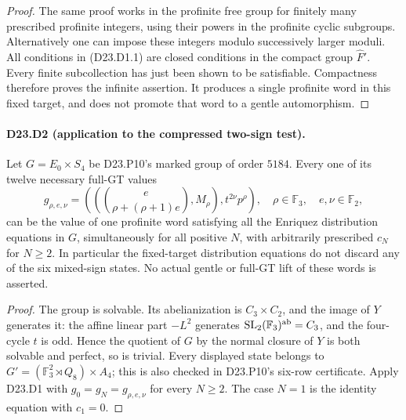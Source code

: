 \begin{proof}
The same proof works in the profinite free group for finitely
many prescribed profinite integers, using their powers in the
profinite cyclic subgroups. Alternatively one can impose these
integers modulo successively larger moduli. All conditions in
(D23.D1.1) are closed conditions in the compact group
$\widehat F'$. Every finite subcollection has just been shown
to be satisfiable. Compactness therefore proves the infinite
assertion. It produces a single profinite word in this fixed
target, and does not promote that word to a gentle automorphism.
\end{proof}

\paragraph{D23.D2 (application to the compressed two-sign test).}
Let $G=E_0\times S_4$ be D23.P10's marked group of order
$5184$. Every one of its twelve necessary full-GT values
\[
 g_{\rho,e,\nu}=
 \left(\left(\binom{e}{\rho+(\rho+1)e},M_\rho\right),
               t^{2\nu}p^\rho\right),
 \quad\rho\in\mathbb F_3,\quad e,\nu\in\mathbb F_2,
\]
can be the value of one profinite word satisfying all the
Enriquez distribution equations in $G$, simultaneously for
all positive $N$, with arbitrarily prescribed $c_N$ for $N\ge2$.
In particular the fixed-target distribution equations do not
discard any of the six mixed-sign states. No actual gentle or
full-GT lift of these words is asserted.

\begin{proof}
The group is solvable. Its abelianization is $C_3\times C_2$,
and the image of $Y$ generates it: the affine linear part
$-L^2$ generates $\operatorname{SL}_2(\mathbb F_3)^{\rm ab}=C_3$,
and the four-cycle $t$ is odd. Hence the quotient of $G$ by
the normal closure of $Y$ is both solvable and perfect, so
is trivial. Every displayed state belongs to
$G'=(\mathbb F_3^2\rtimes Q_8)\times A_4$; this is also
checked in D23.P10's six-row certificate. Apply D23.D1 with
$g_0=g_N=g_{\rho,e,\nu}$ for every $N\ge2$. The case $N=1$
is the identity equation with $c_1=0$.
\end{proof}

